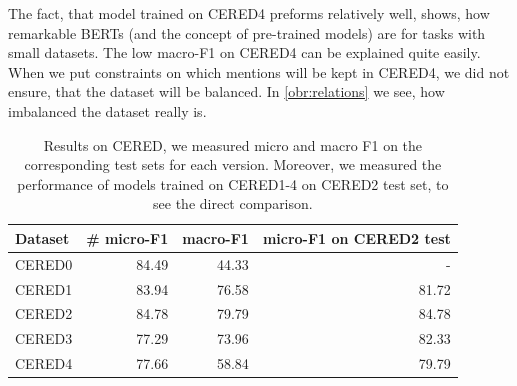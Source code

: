 The fact, that model trained on CERED4 preforms relatively well, shows, how remarkable BERTs (and the concept of pre-trained models) are for tasks with small datasets. The low macro-F1 on CERED4 can be explained quite easily. When we put constraints on which mentions will be kept in CERED4, we did not ensure, that the dataset will be balanced. In \autoref{obr:relations} we see, how imbalanced the dataset really is.





\begin{table}[h]

\caption{Results on CERED, we measured micro and macro F1 on the corresponding test sets for each version. Moreover, we measured the performance of models trained on CERED1-4 on CERED2 test set, to see the direct comparison.}

\label{table:CEREDsResults}

\begin{tabular}{p{} r r r }

\hline
Dataset & \# micro-F1 & macro-F1 & micro-F1 on CERED2 test \\
\hline
\hline
CERED0 & 84.49 & 44.33 & -\\
CERED1 & 83.94 & 76.58 & 81.72 \\
CERED2 & 84.78 & 79.79 & 84.78 \\
CERED3 & 77.29 & 73.96 & 82.33 \\
CERED4 & 77.66 & 58.84 & 79.79 \\
\hline


\end{tabular}

\end{table}


